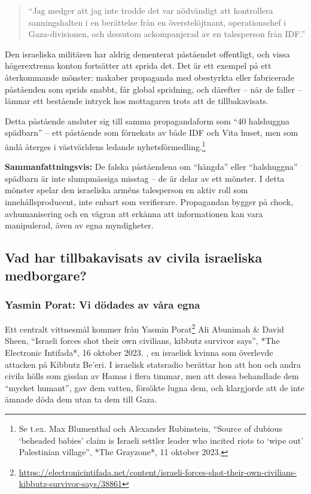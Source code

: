 \begin{quote}
    “Jag medger att jag inte trodde det var nödvändigt att kontrollera sanningshalten i en berättelse från en överstelöjtnant, operationschef i Gaza-divisionen, och dessutom ackompanjerad av en talesperson från IDF.”
\end{quote}

Den israeliska militären har aldrig dementerat påståendet offentligt, och vissa högerextrema konton fortsätter att sprida det. Det är ett exempel på ett återkommande mönster: makaber propaganda med obestyrkta eller fabricerade påståenden som sprids snabbt, får global spridning, och därefter – när de faller – lämnar ett bestående intryck hos mottagaren trots att de tillbakavisats.

Detta påstående ansluter sig till samma propagandaform som “40 halshuggna spädbarn” – ett påstående som förnekats av både IDF och Vita huset, men som ändå återges i västvärldens ledande nyhetsförmedling.\footnote{Se t.ex. Max Blumenthal och Alexander Rubinstein, “Source of dubious ‘beheaded babies’ claim is Israeli settler leader who incited riots to ‘wipe out’ Palestinian village”, *The Grayzone*, 11 oktober 2023.}

\textbf{Sammanfattningsvis:} De falska påståendena om “hängda” eller “halshuggna” spädbarn är inte slumpmässiga misstag – de är delar av ett mönster. I detta mönster spelar den israeliska arméns talesperson en aktiv roll som innehållsproducent, inte enbart som verifierare. Propagandan bygger på chock, avhumanisering och en vägran att erkänna att informationen kan vara manipulerad, även av egna myndigheter.


\subsection*{Vad har tillbakavisats av civila israeliska medborgare?}

\subsubsection*{Yasmin Porat: Vi dödades av våra egna}
Ett centralt vittnesmål kommer från Yasmin Porat\footnote{\url{https://electronicintifada.net/content/israeli-forces-shot-their-own-civilians-kibbutz-survivor-says/38861}} Ali Abunimah \& David Sheen, “Israeli forces shot their own civilians, kibbutz survivor says”, *The Electronic Intifada*, 16 oktober 2023.
, en israelisk kvinna som överlevde attacken på Kibbutz Be’eri. I israelisk statsradio berättar hon att hon och andra civila hölls som gisslan av Hamas i flera timmar, men att dessa behandlade dem “mycket humant”, gav dem vatten, försökte lugna dem, och klargjorde att de inte ämnade döda dem utan ta dem till Gaza.

